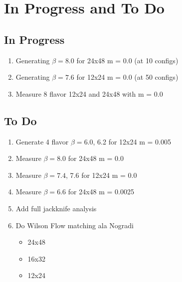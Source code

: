 \documentclass[11pt]{article}
\begin{document}
\section{In Progress and To Do}
\subsection{In Progress} 
\begin{enumerate}
  \item Generating $\beta=8.0$ for 24x48 m = 0.0 (at 10 configs)
  \item Generating $\beta=7.6$ for 12x24 m = 0.0 (at 50 configs)
  \item Measure 8 flavor 12x24 and 24x48 with m = 0.0
\end{enumerate}

\subsection{To Do}

\begin{enumerate}
  \item Generate 4 flavor $\beta=6.0$, 6.2 for 12x24 m = 0.005
  \item Measure $\beta=8.0$ for 24x48 m = 0.0
  \item Measure $\beta=7.4$, 7.6 for 12x24 m = 0.0
  \item Measure $\beta=6.6$ for 24x48 m = 0.0025
  \item Add full jackknife analysis
  \item Do Wilson Flow matching ala Nogradi
    \begin{itemize}
      \item 24x48
      \item 16x32
      \item 12x24
    \end{itemize}
\end{enumerate}
\end{document}
